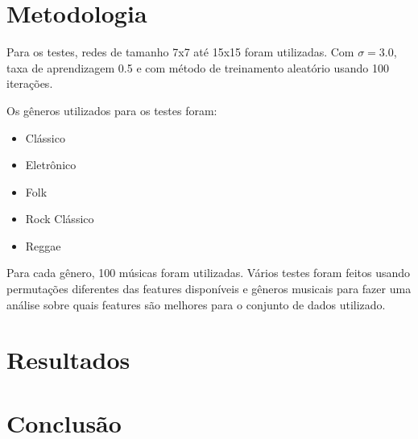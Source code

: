 \documentclass[journal]{IEEEtran}
\begin{document}
\section{Metodologia}
Para os testes, redes de tamanho 7x7 até 15x15 foram utilizadas. Com $\sigma=3.0$, taxa de aprendizagem 0.5 e com método de treinamento aleatório usando 100 iterações.

Os gêneros utilizados para os testes foram:
\begin{itemize}
	\item Clássico
	\item Eletrônico
	\item Folk
	\item Rock Clássico
	\item Reggae
\end{itemize}

Para cada gênero, 100 músicas foram utilizadas. Vários testes foram feitos usando permutações diferentes das features disponíveis e gêneros musicais para fazer uma análise sobre quais features são melhores para o conjunto de dados utilizado.

\section{Resultados}
\blindtext

\section{Conclusão}
\blindtext

\ifCLASSOPTIONcaptionsoff
  \newpage
\fi

\end{document}
